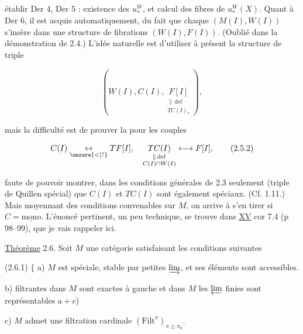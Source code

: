  établir Der 4, Der 5 : existence des $u_*^W$, et
calcul des fibres de $u_*^W(X)$. Quant à Der 6,
il est acquis automatiquement, du fait
que chaque $(M(I),W(I))$ s'insère dans une
structure de fibrations $(W(I),F(I))$. (Oublié
dans la démonstration de 2.4.) L'idée naturelle
est d'utiliser à présent la structure de
triple

\[
 \left(W(I),C(I),\underset{\substack{\|\,\mathrm{def}\\ TC(I)_{*}}}{F[I]}\right),\tag*{(2.5.1)}
\]

mais la difficulté est de prouver la 
pour les couples

\[
 C(I)\underset{\unsure{<|?}}{\leftrightarrow}TF[I],\quad
 \underset{\substack{\|\,\mathrm{def}\\ C(I)\cap W(I)}}{TC(I)}\longleftrightarrow F[I],\tag*{(2.5.2)}
\]

faute de pouvoir montrer, dans les conditions
générales de 2.3 seulement (triple de Quillen
spécial) que $C(I)$ et $TC(I)$ sont également
spéciaux. (Cf.  1.11.) Mais
moyennant des conditions convenables sur
$M$, on arrive à s'en tirer si $C=\underline{\mathrm{mono}}$.
L'énoncé pertinent, un peu technique, se
trouve dans \uline{XV} cor 7.4 (p 98--99), que je
vais rappeler ici.

\uline{Théorème} 2.6. Soit $M$ une catégorie satisfaisant les
conditions suivantes

(2.6.1) \(\Bigg\{\)
a) $M$ est spéciale,  stable par petites $\varinjlim$,
et ses éléments sont accessibles.


b)  filtrantes dans $M$ sont exactes à gauche \unsure{(}et dans $M$ les  $\varprojlim$ finies sont représentables  $a+c$)

c) $M$ admet une filtration cardinale
$(\mathrm{Filt}^{\pi})_{\pi\geq\pi_0}$.

